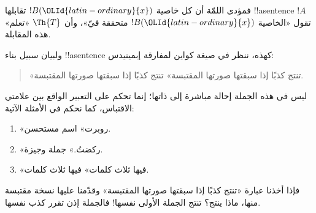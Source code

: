 \documentclass[../../../include/open-logic-section]{subfiles}
\begin{document}
فمؤدى اللمّة أن كل خاصية $!B({\OLId{latin-ordinary}{x}})$ تقابلها !!a{sentence} $!A$
تقول «الخاصية $!B({\OLId{latin-ordinary}{x}})$ متحققة فيّ»، وأن $\Th{T}$ «تعلم» هذه
المقابلة.

ولبيان سبيل بناء !!a{sentence} كهذه، ننظر في صيغة كواين
لمفارقة إبمينيدس:
\begin{quote}
«تنتج كذبًا إذا سبقتها صورتها المقتبسة» تنتج كذبًا إذا سبقتها صورتها
المقتبسة.
\end{quote}
ليس في هذه الجملة إحالة مباشرة إلى ذاتها؛ إنما تحكم على التعبير
الواقع بين علامتي الاقتباس، كما نحكم في الأمثلة الآتية:
\begin{enumerate}
\item «روبرت» اسم مستحسن.
\item «ركضتُ.» جملة وجيزة.
\item «فيها ثلاث كلمات» فيها ثلاث كلمات.
\end{enumerate}
فإذا أخذنا عبارة «تنتج كذبًا إذا سبقتها صورتها المقتبسة» وقدّمنا
عليها نسخة مقتبسة منها، ماذا ينتج؟ تنتج الجملة الأولى نفسها!{}
فالجملة إذن تقرر كذب نفسها.
\end{document}
